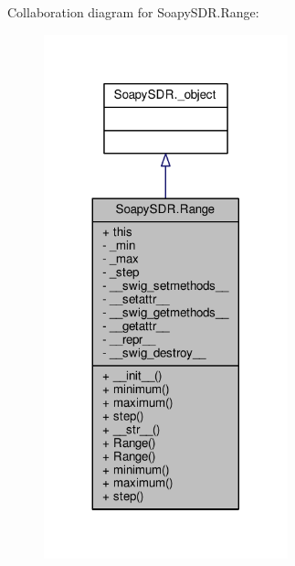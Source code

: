Collaboration diagram for Soapy\+S\+D\+R.\+Range\+:
\nopagebreak
\begin{figure}[H]
\begin{center}
\leavevmode
\includegraphics[width=200pt]{d5/d4f/classSoapySDR_1_1Range__coll__graph}
\end{center}
\end{figure}
